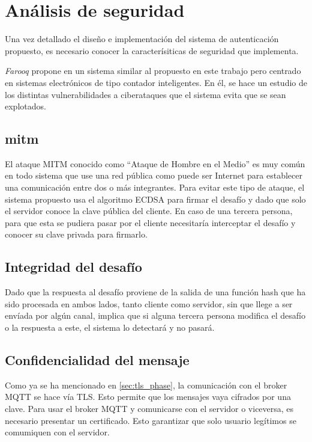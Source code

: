 \cleardoublepage

\chapter{Análisis de seguridad}

Una vez detallado el diseño e implementación del sistema de autenticación propuesto, es necesario conocer la caracterísiticas
de seguridad que implementa. 

\textit{Farooq} propone en \cite{farooq2019elliptic} un sistema similar al propuesto en este trabajo pero centrado en sistemas
electrónicos de tipo contador inteligentes. En él, se hace un estudio de los distintas vulnerabilidades a ciberataques que 
el sistema evita que se sean explotados.

\section{\acrfull{mitm}}

El ataque MITM conocido como ``Ataque de Hombre en el Medio'' es muy común en todo sistema que use una red pública como puede
ser Internet para establecer una comunicación entre dos o más integrantes. 
Para evitar este tipo de ataque, el sistema propuesto usa el algoritmo ECDSA para firmar el desafío y dado que solo el servidor
conoce la clave pública del cliente. En caso de una tercera persona, para que esta se pudiera pasar por el cliente
necesitaría interceptar el desafío y conocer su clave privada para firmarlo. 

\section{Integridad del desafío}

Dado que la respuesta al desafío proviene de la salida de una función hash que ha sido procesada en ambos lados, tanto cliente
como servidor, sin que llege a ser envíada por algún canal, implica que si alguna tercera persona modifica el desafío o la respuesta
a este, el sistema lo detectará y no pasará.

\section{Confidencialidad del mensaje}

Como ya se ha mencionado en \ref{sec:tls_phase}, la comunicación con el broker MQTT se hace vía TLS. Esto permite que los 
mensajes vaya cifrados por una clave. Para usar el broker MQTT y comunicarse con el servidor o viceversa, es necesario presentar
un certificado. Esto garantizar que solo usuario legítimos se comumiquen con el servidor.




